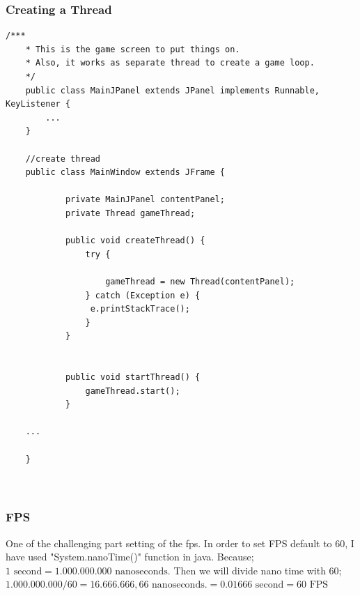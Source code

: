 \documentclass{article}
\begin{document}
\subsubsection{Creating a Thread}
\begin{lstlisting}[style=CStyle]
    /***
 	* This is the game screen to put things on.
 	* Also, it works as separate thread to create a game loop.
 	*/
    public class MainJPanel extends JPanel implements Runnable, KeyListener {
		...    
    }
    
    //create thread
    public class MainWindow extends JFrame {

    		private MainJPanel contentPanel;
    		private Thread gameThread;
    		
    		public void createThread() {
        		try {
           
            		gameThread = new Thread(contentPanel);
        		} catch (Exception e) {
           		 e.printStackTrace();
        		}
        	}
    
  		
    		public void startThread() {
        		gameThread.start();
    		}
    
    ...
    
    }
    
    
\end{lstlisting}

\subsubsection{FPS}
One of the challenging part setting of the fps. In order to set FPS default to 60, I have used "System.nanoTime()" function in java. Because; \\
\newline
$ 1 \text{ second} = 1.000.000.000 \text{ nanoseconds.}$
\newline
\newline
Then we will divide nano time with 60; \\
\newline
$ 1.000.000.000 / 60 = 16.666.666,66 \text{ nanoseconds.} = 0.01666 \text{ second} = 60 \text{ FPS}$
\end{document}
